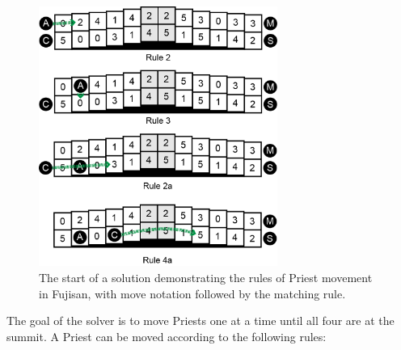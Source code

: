 \documentclass[journal]{IEEEtran}
\begin{document}
\begin{figure}[t]
\centering
\includegraphics[width=7.8cm]{figure12.png}
\caption{The start of a solution demonstrating the rules of Priest movement in Fujisan, with move notation followed by the matching rule. }
\label{fig:priestrules}
\end{figure}

The goal of the solver is to move Priests one at a time until all four are at the summit. A Priest can be moved according to the following rules:  
\end{document}
